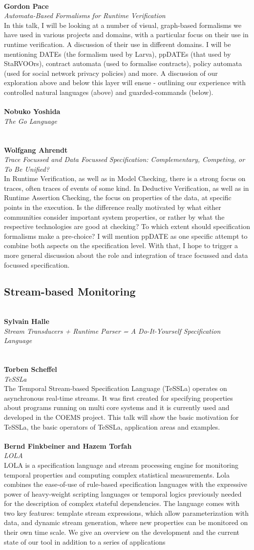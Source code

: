 \documentclass{article}
\newcounter{talkc}
\newcommand{\talk}[3]{\stepcounter{talkc}
\vspace{0.5em}~\\
\noindent
\textbf{#1}\\ 
\noindent\emph{#2}\\ 
\noindent#3\\
}
\begin{document}
%
\talk{Gordon Pace}{Automata-Based Formalisms for Runtime Verification}{In this talk, I will be looking at a number of visual, graph-based formalisms we have used in various projects and domains, with a particular focus on their use in runtime verification. A discussion of their use in different domains. I will be mentioning DATEs (the formalism used by Larva), ppDATEs (that used by StaRVOOrs), contract automata (used to formalise contracts), policy automata (used for social network privacy policies) and more. A discussion of our exploration above and below this layer will ensue - outlining our experience with controlled natural languages (above) and guarded-commands (below).}
%
\talk{Nobuko Yoshida}{The Go Language}{}
%
\talk{Wolfgang Ahrendt}{Trace Focussed and Data Focussed Specification: Complementary, Competing, or To Be Unified?}{In Runtime Verification, as well as in Model Checking, there is a strong focus on traces, often traces of events of some kind. In Deductive Verification, as well as in Runtime Assertion Checking, the focus on properties of the data, at specific points in the execution. Is the difference really motivated by what either communities consider important system properties, or rather by what the respective technologies are good at checking? To which extent should specification formalisms make a pre-choice? I will mention ppDATE as one specific attempt to combine both aspects on the specification level. With that, I hope to trigger a more general discussion about the role and integration of trace focussed and data focussed specification.}
%


\subsection*{Stream-based Monitoring}

\talk{Sylvain Halle}{Stream Transducers + Runtime Parser = A Do-It-Yourself Specification Language}{}
%
\talk{Torben Scheffel}{TeSSLa}{The Temporal Stream-based Specification Language (TeSSLa) operates on asynchronous real-time streams. It was first created for specifying properties about programs running on multi core systems and it is currently used and developed in the COEMS project. This talk will show the basic motivation for TeSSLa, the basic operators of TeSSLa, application areas and examples.}
%
\talk{Bernd Finkbeiner and Hazem Torfah}{LOLA}{LOLA is a specification language and stream processing engine for monitoring temporal properties and computing complex statistical measurements. Lola combines the ease-of-use of rule-based specification languages with the expressive power of heavy-weight scripting languages or temporal logics previously needed for the description of complex stateful dependencies. The language comes with two key features: template stream expressions, which allow parameterization with data, and dynamic stream generation, where new properties can be monitored on their own time scale. We give an overview on the development and the current state of our tool in addition to a series of applications}
\end{document}
